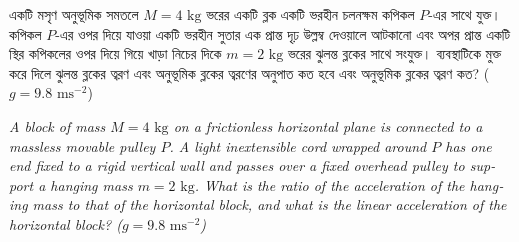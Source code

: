 \documentclass[12pt, a4paper]{article}
\begin{document}
\begin{tcolorbox}[questionbox={প্রশ্ন (Question) 7}]
\noindent
একটি মসৃণ অনুভূমিক সমতলে $M = 4\text{ kg}$ ভরের একটি ব্লক একটি ভরহীন চলনক্ষম কপিকল $P$-এর সাথে যুক্ত। কপিকল $P$-এর ওপর দিয়ে যাওয়া একটি ভরহীন সুতার এক প্রান্ত দৃঢ় উল্লম্ব দেওয়ালে আটকানো এবং অপর প্রান্ত একটি স্থির কপিকলের ওপর দিয়ে গিয়ে খাড়া নিচের দিকে $m = 2\text{ kg}$ ভরের ঝুলন্ত ব্লকের সাথে সংযুক্ত। ব্যবস্থাটিকে মুক্ত করে দিলে ঝুলন্ত ব্লকের ত্বরণ এবং অনুভূমিক ব্লকের ত্বরণের অনুপাত কত হবে এবং অনুভূমিক ব্লকের ত্বরণ কত? ($g = 9.8\text{ ms}^{-2}$)

\vspace{0.8em}
\begin{english}
\noindent\textit{\color{darkgray}
A block of mass $M = 4\text{ kg}$ on a frictionless horizontal plane is connected to a massless movable pulley $P$. A light inextensible cord wrapped around $P$ has one end fixed to a rigid vertical wall and passes over a fixed overhead pulley to support a hanging mass $m = 2\text{ kg}$. What is the ratio of the acceleration of the hanging mass to that of the horizontal block, and what is the linear acceleration of the horizontal block? ($g = 9.8\text{ ms}^{-2}$)
}
\end{english}
\end{tcolorbox}
\end{document}
